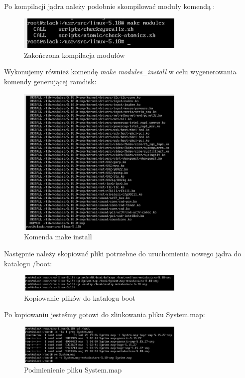 \documentclass[12pt]{article}
\begin{document}
Po kompilacji jądra należy podobnie skompilować moduły komendą :

\begin{figure}[H]
\centering
\includegraphics[width=8cm]{kompilacja-modulow.jpg}
\caption{Zakończona kompilacja modułów}
\end{figure}

Wykonujemy również komendę \textit{make modules\_install} w celu wygenerowania komendy generującej ramdisk:

\begin{figure}[H]
\centering
\includegraphics[width=8cm]{make install.jpg}
\caption{Komenda make install}
\end{figure}

Następnie należy skopiować pliki potrzebne do uruchomienia nowego jądra do katalogu /boot:

\begin{figure}[H]
\centering
\includegraphics[width=8cm]{kopiowanieplikow.jpg}
\caption{Kopiowanie plików do katalogu boot}
\end{figure}

Po kopiowaniu jesteśmy gotowi do zlinkowania pliku System.map:

\begin{figure}[H]
\centering
\includegraphics[width=8cm]{linksystemmap.jpg}
\caption{Podmienienie pliku System.map}
\end{figure}
\end{document}
